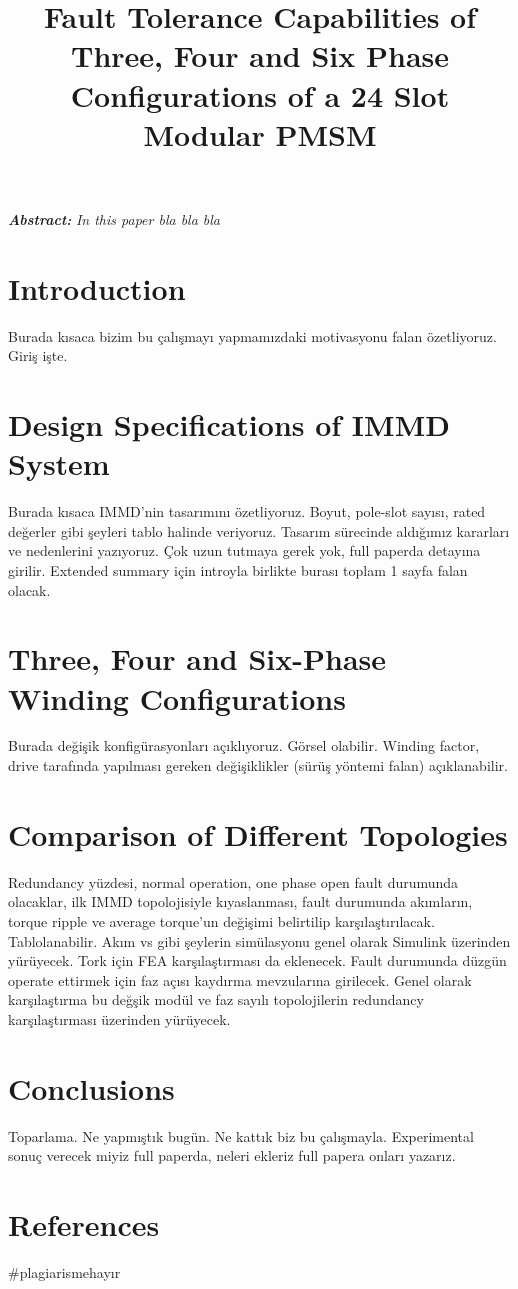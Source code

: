 \documentclass[a4paper,11pt]{article}
\title{\normalsize\textbf{Fault Tolerance Capabilities of Three, Four and Six Phase Configurations of a 24 Slot Modular PMSM}}
\date{}
\begin{document}
\vspace{-45mm}
\maketitle
\vspace{-30mm}
\textit{\normalsize\textbf{Abstract:}}
\textit{In this paper bla bla bla}
\section{\normalsize\textbf{Introduction}}
Burada kısaca bizim bu çalışmayı yapmamızdaki motivasyonu falan özetliyoruz. Giriş işte.

\section{\normalsize\textbf{Design Specifications of IMMD System}}
Burada kısaca IMMD'nin tasarımını özetliyoruz. Boyut, pole-slot sayısı, rated değerler gibi şeyleri tablo halinde veriyoruz. Tasarım sürecinde aldığımız kararları ve nedenlerini yazıyoruz. Çok uzun tutmaya gerek yok, full paperda detayına girilir. Extended summary için introyla birlikte burası toplam 1 sayfa falan olacak.
 
\section{\normalsize\textbf{Three, Four and Six-Phase Winding Configurations}}
Burada değişik konfigürasyonları açıklıyoruz. Görsel olabilir. Winding factor, drive tarafında yapılması gereken değişiklikler (sürüş yöntemi falan) açıklanabilir.

\section{\normalsize\textbf{Comparison of Different Topologies}}
Redundancy yüzdesi, normal operation, one phase open fault durumunda olacaklar, ilk IMMD topolojisiyle kıyaslanması, fault durumunda akımların, torque ripple ve average torque'un değişimi belirtilip karşılaştırılacak. Tablolanabilir. Akım vs gibi şeylerin simülasyonu genel olarak Simulink üzerinden yürüyecek. Tork için FEA karşılaştırması da eklenecek. Fault durumunda düzgün operate ettirmek için faz açısı kaydırma mevzularına girilecek. Genel olarak karşılaştırma bu değşik modül ve faz sayılı topolojilerin redundancy karşılaştırması üzerinden yürüyecek. 

\section{\normalsize\textbf{Conclusions}}
Toparlama. Ne yapmıştık bugün. Ne kattık biz bu çalışmayla. Experimental sonuç verecek miyiz full paperda, neleri ekleriz full papera onları yazarız.

\section{\normalsize\textbf{References}}
\#plagiarismehayır
\end{document}
